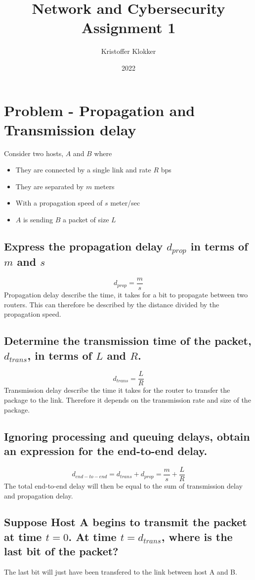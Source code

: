 \documentclass[12pt, a4paper]{article}
\title{Network and Cybersecurity\\ Assignment 1}
\date{2022}
\author{Kristoffer Klokker}
\begin{document}
	\maketitle
	\clearpage
	\tableofcontents
	\clearpage
	\section{Problem - Propagation and Transmission delay}
		Consider two hosts, $A$ and $B$ where
		\begin{itemize}
			\item They are connected by a single link and rate $R$ bps
			\item They are separated by $m$ meters
			\item With a propagation speed of $s$ meter/sec
			\item $A$ is sending $B$ a packet of size $L$
		\end{itemize}
		\subsection{Express the propagation delay $d_{prop}$ in terms of $m$ and $s$}
			$$d_{prop}=\frac{m}{s}$$
			Propagation delay describe the time, it takes for a bit to propagate between two routers. This can therefore be described by the distance divided by the propagation speed.
		\subsection{Determine the transmission time of the packet, $d_{trans}$, in terms of $L$ and $R$.}
			$$ d_{trans}=\frac{L}{R}$$
			Transmission delay describe the time it takes for the router to transfer the package to the link. Therefore it depends on the transmission rate and size of the package.
		\subsection{Ignoring processing and queuing delays, obtain an expression for the end-to-end delay.}
			$$d_{end-to-end}=d_{trans}+d_{prop}=\frac{m}{s}+\frac{L}{R}$$
			The total end-to-end delay will then be equal to the sum of transmission delay and propagation delay.
		\subsection{Suppose Host A begins to transmit the packet at time $t=0$. At time $t=d_{trans}$, where is the last bit of the packet?}
			The last bit will just have been transfered to the link between host A and B. 
\end{document}
